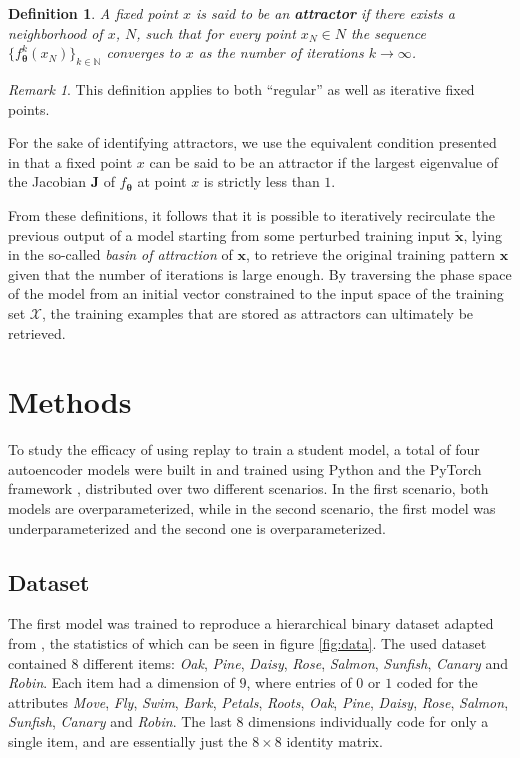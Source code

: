 \documentclass[11pt]{article}
\newtheorem*{definition}{Definition}
\theoremstyle{remark}
\newtheorem*{remark}{Remark}
\begin{document}
\begin{definition}
  A fixed point $x$ is said to be an \textbf{attractor} if there exists a neighborhood of $x$, $N$, such that for every point $x_N \in N$ the sequence $\{f^k_{\bm{\theta}}(x_N)\}_{k\in \mathbb{N}}$ converges to $x$ as the number of iterations $k \rightarrow \infty$.
\end{definition}

\begin{remark}
  This definition applies to both ``regular'' as well as iterative fixed points.
\end{remark}

\noindent For the sake of identifying attractors, we use the equivalent condition presented in \cite{strogatz1994nonlinear} that a fixed point $x$ can be said to be an attractor if the largest eigenvalue of the Jacobian $\mathbf{J}$ of $f_{\bm{\theta}}$ at point $x$ is strictly less than $1$.

From these definitions, it follows that it is possible to iteratively recirculate the previous output of a model starting from some perturbed training input $\bm{\tilde{x}}$, lying in the so-called \textit{basin of attraction} of $\bm{x}$, to retrieve the original training pattern $\bm{x}$ given that the number of iterations is large enough. By traversing the phase space of the model from an initial vector constrained to the input space of the training set $\mathcal{X}$, the training examples that are stored as attractors can ultimately be retrieved.

\section{Methods}

To study the efficacy of using replay to train a student model, a total of four autoencoder models were built in and trained using Python and the PyTorch framework \cite{paszke2019pytorch}, distributed over two different scenarios. In the first scenario, both models are overparameterized, while in the second scenario, the first model was underparameterized and the second one is overparameterized.

\subsection{Dataset}

The first model was trained to reproduce a hierarchical binary dataset adapted from \cite{rogers2004semantic}, the statistics of which can be seen in figure \ref{fig:data}. The used dataset contained $8$ different items: \textit{Oak}, \textit{Pine}, \textit{Daisy}, \textit{Rose}, \textit{Salmon}, \textit{Sunfish}, \textit{Canary} and \textit{Robin}. Each item had a dimension of $9$, where entries of $0$ or $1$ coded for the attributes \textit{Move}, \textit{Fly}, \textit{Swim}, \textit{Bark}, \textit{Petals}, \textit{Roots}, \textit{Oak}, \textit{Pine}, \textit{Daisy}, \textit{Rose}, \textit{Salmon}, \textit{Sunfish}, \textit{Canary} and \textit{Robin}. The last $8$ dimensions individually code for only a single item, and are essentially just the $8 \times 8$ identity matrix.
\end{document}
